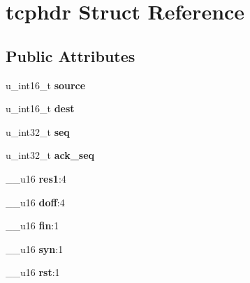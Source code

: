 \hypertarget{structtcphdr}{
\section{tcphdr Struct Reference}
\label{structtcphdr}
}
\subsection*{Public Attributes}
\begin{DoxyCompactItemize}
\item 
\hypertarget{structtcphdr_a237bbad545d0fa3d03c4926397fc63b1}{
u\_\-int16\_\-t {\bfseries source}}
\label{structtcphdr_a237bbad545d0fa3d03c4926397fc63b1}

\item 
\hypertarget{structtcphdr_a1649e642cbac81e284afb2c3ce4f4adc}{
u\_\-int16\_\-t {\bfseries dest}}
\label{structtcphdr_a1649e642cbac81e284afb2c3ce4f4adc}

\item 
\hypertarget{structtcphdr_aa89b8f0aa54b82a3c8a2f75e6d3702e6}{
u\_\-int32\_\-t {\bfseries seq}}
\label{structtcphdr_aa89b8f0aa54b82a3c8a2f75e6d3702e6}

\item 
\hypertarget{structtcphdr_aef843bbe47e5fb163c08cee3b18268da}{
u\_\-int32\_\-t {\bfseries ack\_\-seq}}
\label{structtcphdr_aef843bbe47e5fb163c08cee3b18268da}

\item 
\hypertarget{structtcphdr_a74cbc36c7afdceff4c97aed85f016014}{
\_\-\_\-u16 {\bfseries res1}:4}
\label{structtcphdr_a74cbc36c7afdceff4c97aed85f016014}

\item 
\hypertarget{structtcphdr_ab110ade4f89596127e0be503a7655053}{
\_\-\_\-u16 {\bfseries doff}:4}
\label{structtcphdr_ab110ade4f89596127e0be503a7655053}

\item 
\hypertarget{structtcphdr_a4dc743f212d9b5b741f2ed43958bb7dc}{
\_\-\_\-u16 {\bfseries fin}:1}
\label{structtcphdr_a4dc743f212d9b5b741f2ed43958bb7dc}

\item 
\hypertarget{structtcphdr_ad72ba77096b7c6fd872699e71381fa64}{
\_\-\_\-u16 {\bfseries syn}:1}
\label{structtcphdr_ad72ba77096b7c6fd872699e71381fa64}

\item 
\hypertarget{structtcphdr_ae149a7b6cd9eab486c94043555ba1b74}{
\_\-\_\-u16 {\bfseries rst}:1}
\label{structtcphdr_ae149a7b6cd9eab486c94043555ba1b74}


\end{DoxyCompactItemize}
